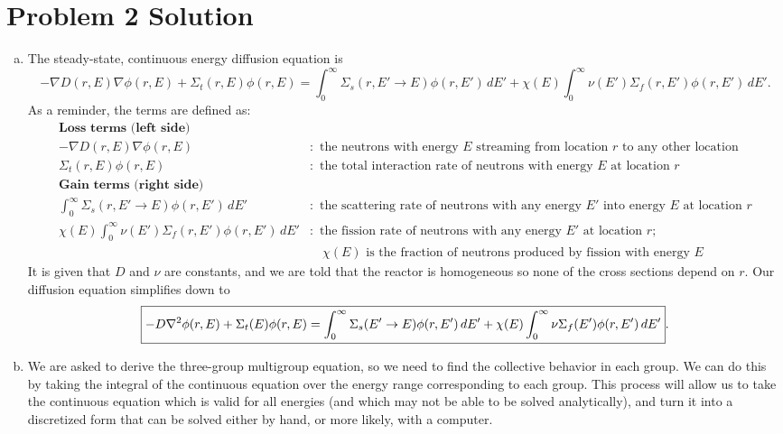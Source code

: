 \section*{Problem 2 Solution}

\begin{enumerate}[a)]

\item 

The steady-state, continuous energy diffusion equation is
$$ -\nabla D(r,E) \nabla \phi(r,E) + \Sigma_t(r,E) \phi(r,E) = \int_0^{\infty} \Sigma_s(r,E' \rightarrow E)\phi(r,E')\,dE' + \chi(E) \int_0^{\infty} \nu(E') \Sigma_f(r,E')\phi(r,E')\,dE' .$$
As a reminder, the terms are defined as:
\begin{align*}
\textbf{Loss terms (left side)} \qquad\qquad& \\
-\nabla D(r,E) \nabla \phi(r,E)&:\text{ the neutrons with energy }E\text{ streaming from location }r\text{ to any other location} \\
\Sigma_t(r,E) \phi(r,E)&:\text{ the total interaction rate of neutrons with energy }E\text{ at location }r  \\
\textbf{Gain terms (right side)} \qquad\qquad& \\
\int_0^{\infty} \Sigma_s(r,E' \rightarrow E)\phi(r,E')\,dE'&:\text{ the scattering rate of neutrons with any energy }E'\text{ into energy }E\text{ at location }r \\
\chi(E) \int_0^{\infty} \nu(E') \Sigma_f(r,E')\phi(r,E')\,dE'&:\text{ the fission rate of neutrons with any energy }E'\text{ at location }r; \\
& \quad\chi(E)\text{ is the fraction of neutrons produced by fission with energy }E
\end{align*}
It is given that $D$ and $\nu$ are constants, and we are told that the reactor is homogeneous so none of the cross sections depend on $r$. Our diffusion equation simplifies down to
$$\boxed{ -D \nabla^2 \phi(r,E) + \Sigma_t(E) \phi(r,E) = \int_0^{\infty} \Sigma_s(E' \rightarrow E)\phi(r,E')\,dE' + \chi(E) \int_0^{\infty} \nu \Sigma_f(E')\phi(r,E')\,dE' }.$$

\item

We are asked to derive the three-group multigroup equation, so we need to find the collective behavior in each group. We can do this by taking the integral of the continuous equation over the energy range corresponding to each group. This process will allow us to take the continuous equation which is valid for all energies (and which may not be able to be solved analytically), and turn it into a discretized form that can be solved either by hand, or more likely, with a computer.


\end{enumerate}
